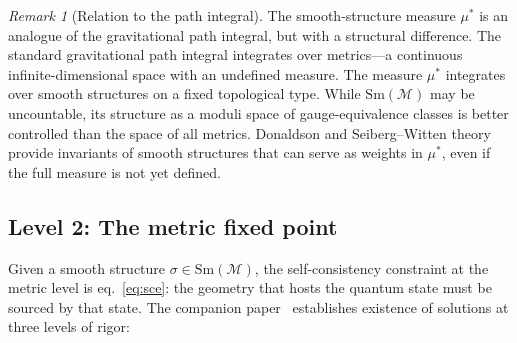 \documentclass[12pt,a4paper]{article}
\theoremstyle{definition}
\theoremstyle{remark}
\newtheorem{remark}{Remark}
\begin{document}
\begin{remark}[Relation to the path integral]
The smooth-structure measure $\mu^*$ is an analogue of the gravitational
path integral, but with a structural difference. The standard
gravitational path integral integrates over metrics---a continuous
infinite-dimensional space with an undefined measure. The measure $\mu^*$
integrates over smooth structures on a fixed topological type. While
$\mathrm{Sm}(\mathcal{M})$ may be uncountable, its structure as a moduli
space of gauge-equivalence classes is better controlled than the space of
all metrics. Donaldson and Seiberg--Witten theory provide invariants of
smooth structures that can serve as weights in $\mu^*$, even if the full
measure is not yet defined.
\end{remark}

\subsection{Level 2: The metric fixed point}
\label{sec:level2}

Given a smooth structure $\sigma \in \mathrm{Sm}(\mathcal{M})$, the
self-consistency constraint at the metric level is
eq.~\eqref{eq:sce}: the geometry that hosts the quantum state must be
sourced by that state. The companion paper~\cite{fixed_point} establishes
existence of solutions at three levels of rigor:
\end{document}
